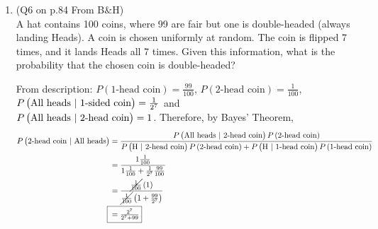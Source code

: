 \documentclass[11pt]{article}
\begin{document}
\begin{enumerate}
	\item (Q6 on p.84 From B\&H)\\
	A hat contains 100 coins, where 99 are fair but one is double-headed (always landing Heads). A coin is chosen uniformly at random. The coin is flipped 7 times, and it lands Heads all 7 times. Given this information, what is the probability that the chosen coin is double-headed?
		\begin{mdframed}
			From description: $ P\left( \text{1-head coin} \right) = \frac{99}{100}$, $ P\left( \text{2-head coin} \right) = \frac{1}{100} $, $ P\left( \text{All heads $ | $ 1-sided coin} \right) = \frac{1}{2^7}$ and \\
			$ P\left( \text{All heads $ | $ 2-head coin} \right) = 1$. Therefore, by Bayes' Theorem,
			\begin{align*}
				P\left( \text{2-head coin $ | $ All heads} \right) &= \frac{P\left( \text{All heads $ | $ 2-head coin} \right) P\left( \text{2-head coin} \right)}{P\left( \text{H $ | $ 2-head coin} \right) P\left( \text{2-head coin} \right) + P\left( \text{H $ | $ 1-head coin} \right)P\left( \text{1-head coin} \right)}\\
				&= \frac{1 \frac{1}{100}}{1 \frac{1}{100} + \frac{1}{2^7}\frac{99}{100}}\\
				&= \frac{\cancel{\frac{1}{100}}\left( 1 \right)}{\cancel{\frac{1}{100}}\left( 1 + \frac{99}{2^7} \right)}\\
				\Aboxed{{} &= \tfrac{2^7}{2^7 + 99}}
			\end{align*}
		\end{mdframed}
\end{enumerate}
\end{document}
